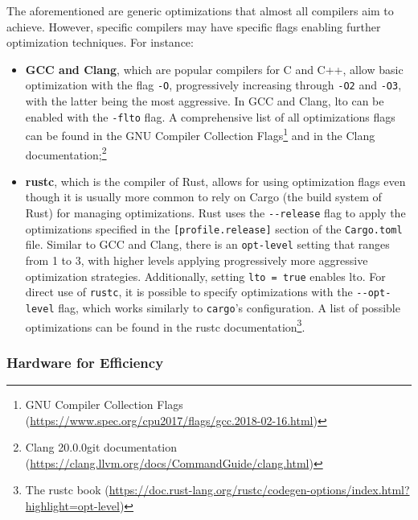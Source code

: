 The aforementioned are generic optimizations that almost all compilers aim to achieve. However, specific compilers may have specific flags enabling further optimization techniques. For instance:

\begin{itemize}
	
	\item \textbf{GCC and Clang}, which are popular compilers for C and C++, allow basic optimization with the flag \texttt{-O}, progressively increasing through \texttt{-O2} and \texttt{-O3}, with the latter being the most aggressive. In GCC and Clang, \gls{lto} can be enabled with the \texttt{-flto} flag. A comprehensive list of all optimizations flags can be found in the GNU Compiler Collection Flags\footnote{GNU Compiler Collection Flags (\url{https://www.spec.org/cpu2017/flags/gcc.2018-02-16.html})} and in the Clang documentation;\footnote{Clang 20.0.0git documentation (\url{https://clang.llvm.org/docs/CommandGuide/clang.html})}
	
	\item \textbf{rustc}, which is the compiler of Rust, allows for using optimization flags even though it is usually more common to rely on Cargo (the build system of Rust) for managing optimizations. Rust uses the \texttt{-{}-release} flag to apply the optimizations specified in the \texttt{[profile.release]} section of the \texttt{Cargo.toml} file. Similar to GCC and Clang, there is an \texttt{opt-level} setting that ranges from 1 to 3, with higher levels applying progressively more aggressive optimization strategies. Additionally, setting \texttt{lto = true} enables \gls{lto}. For direct use of \texttt{rustc}, it is possible to specify optimizations with the \texttt{-{}-opt-level} flag, which works similarly to \texttt{cargo}'s configuration. A list of possible optimizations can be found in the rustc documentation\footnote{The rustc book (\url{https://doc.rust-lang.org/rustc/codegen-options/index.html?highlight=opt-level})}.
	
\end{itemize}



\subsubsection{Hardware for Efficiency}\label{sec:security_of_cryptographic_algorithms:performance:hardware}

